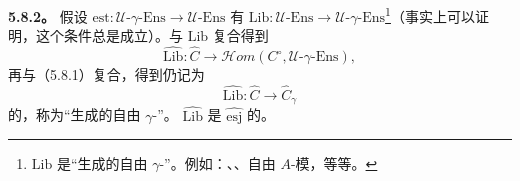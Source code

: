 \textbf{5.8.2。} 假设 $\mathrm{est}:\mathcal U\text{-}\gamma\text{-}\mathrm{Ens}\to\mathcal U\text{-}\mathrm{Ens}$ 有 $\mathrm{Lib}:\mathcal U\text{-}\mathrm{Ens}\to\mathcal U\text{-}\gamma\text{-}\mathrm{Ens}$\footnote[3]{ $\mathrm{Lib}$ 是“生成的自由 $\gamma$-”。例如：、、自由 $A$-模，等等。}（事实上可以证明，这个条件总是成立）。与 $\mathrm{Lib}$ 复合得到
\[\widehat{\mathrm{Lib}}:\widehat C\longrightarrow\mathcal H om(C^\circ,\mathcal U\text{-}\gamma\text{-}\mathrm{Ens}),\]
再与（5.8.1）复合，得到仍记为
\[\widehat{\mathrm{Lib}}:\widehat C\longrightarrow\widehat C_\gamma\]
的，称为“生成的自由 $\gamma$-”。 $\widehat{\mathrm{Lib}}$ 是 $\widehat{\mathrm{esj}}$ 的。
